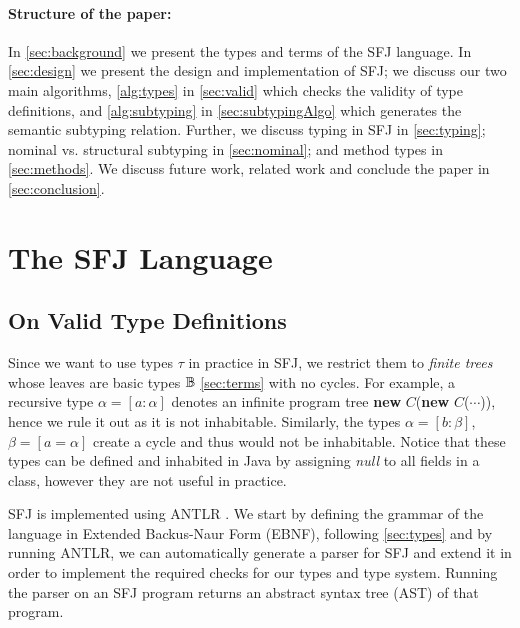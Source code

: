 \documentclass[runningheads]{llncs}
\begin{document}

\paragraph{Structure of the paper:}
In \autoref{sec:background} we present the types and terms of the SFJ language.
In \autoref{sec:design} we present the design and implementation of SFJ; we discuss our two main algorithms, \autoref{alg:types} in \autoref{sec:valid} which checks the validity of type definitions, and \autoref{alg:subtyping} in \autoref{sec:subtypingAlgo} which generates the semantic subtyping relation. Further, we discuss typing in SFJ in \autoref{sec:typing}; nominal vs. structural subtyping in \autoref{sec:nominal}; and method types in \autoref{sec:methods}.
We discuss future work, related work and conclude the paper in \autoref{sec:conclusion}.



\section{The SFJ Language}
\label{sec:design}
\subsection{On Valid Type Definitions}
\label{sec:valid}
Since we want to use types $\tau$ in practice in SFJ, we restrict them to \emph{finite trees} whose leaves are basic types ${\mathbb B}$ \autoref{sec:terms} with no cycles.
For example, a recursive type $\alpha = [a : \alpha]$ denotes an infinite program tree \textbf{new} $C$(\textbf{new} $C$($\cdots{}$)), hence we rule it out as it is not inhabitable.
Similarly, the types $\alpha = [b: \beta]$, $\beta = [a = \alpha]$ create a cycle and thus would not be inhabitable.
Notice that these types can be defined and inhabited in Java by assigning \emph{null} to all fields in a class, however they are not useful in practice.

SFJ is implemented using ANTLR \cite{parr2013}.
We start by defining the grammar of the language in Extended Backus-Naur Form (EBNF), following \autoref{sec:types} and by running ANTLR, we can automatically generate a parser for SFJ and extend it in order to implement the required checks for our types and type system.
Running the parser on an SFJ program returns an abstract syntax tree (AST) of that program.
\end{document}
